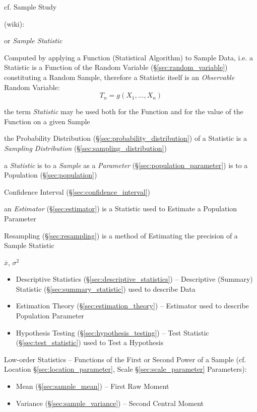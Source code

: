 cf. Sample Study

(wiki):

or \emph{Sample Statistic}

Computed by applying a Function (Statistical Algorithm) to Sample Data, i.e. a
Statistic is a Function of the Random Variable (\S\ref{sec:random_variable})
constituting a Random Sample, therefore a Statistic itself is an
\emph{Observable} Random Variable:
\[
  T_n = g(X_1, \ldots, X_n)
\]

the term \emph{Statistic} may be used both for the Function and for the value of
the Function on a given Sample

the Probability Distribution (\S\ref{sec:probability_distribution}) of a
Statistic is a \emph{Sampling Distribution} (\S\ref{sec:sampling_distribution})

a \emph{Statistic} is to a \emph{Sample} as a \emph{Parameter}
(\S\ref{sec:population_parameter}) is to a Population (\S\ref{sec:population})

Confidence Interval (\S\ref{sec:confidence_interval})

\fist an \emph{Estimator} (\S\ref{sec:estimator}) is a Statistic used to
Estimate a Population Parameter

\fist Resampling (\S\ref{sec:resampling}) is a method of Estimating the
precision of a Sample Statistic

$\overline{x}$, $\sigma^2$

\begin{itemize}
  \item Descriptive Statistics (\S\ref{sec:descriptive_statistics}) --
    Descriptive (Summary) Statistic (\S\ref{sec:summary_statistic}) used to
    describe Data
  \item Estimation Theory (\S\ref{sec:estimation_theory}) -- Estimator used to
    describe Population Parameter
  \item Hypothesis Testing (\S\ref{sec:hypothesis_testing}) -- Test Statistic
    (\S\ref{sec:test_statistic}) used to Test a Hypothesis
\end{itemize}

Low-order Statistics -- Functions of the First or Second Power of a Sample (cf.
Location \S\ref{sec:location_parameter}, Scale \S\ref{sec:scale_parameter}
Parameters):
\begin{itemize}
  \item Mean (\S\ref{sec:sample_mean}) -- First Raw Moment
  \item Variance (\S\ref{sec:sample_variance}) -- Second Central Moment
\end{itemize}

